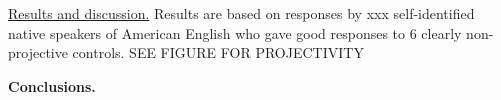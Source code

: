 \documentclass[12pt]{article}
\newcommand{\6}{\mbox{$[\hspace*{-.6mm}[$}}
\newcommand{\9}{\mbox{$]\hspace*{-.6mm}]$}}
\begin{document}
\underline{Results and discussion.} Results are based on responses by xxx self-identified native speakers of American English who gave good responses to 6 clearly non-projective controls.  SEE FIGURE FOR PROJECTIVITY 

{\bf Conclusions.}

\newpage


\begin{small}


\end{small}
\end{document}
